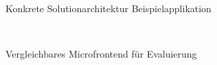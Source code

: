 \begin{figure}[hbt!]
	\centering
	\begin{minipage}[t]{0.6\textwidth}	
		\caption{Konkrete Solutionarchitektur Beispielapplikation}
		\\ %
		\label{fig:SolutionarchitekturBeispielapplikationKonkret}
	\end{minipage}
\end{figure}

\newpage
\begin{figure}[hbt!]
	\centering
	\begin{minipage}[t]{0.7\textwidth}	
		\caption{Vergleichbares Microfrontend für Evaluierung}
		\\ %
		\label{fig:EvalAnsicht}
	\end{minipage}
\end{figure}

